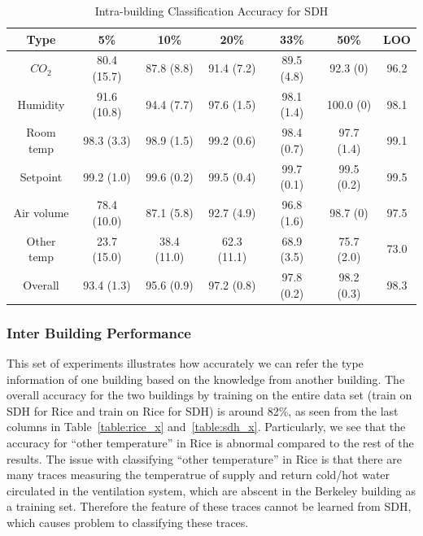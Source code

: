 \begin{table}[ht!]
\centering %
\begin{tabular}{c | c | c | c | c | c | c}%
\hline %
Type & 5\% & 10\% & 20\% & 33\% & 50\% & LOO\\ %
\hline\hline %
$CO_{2}$ & 80.4 (15.7) & 87.8 (8.8) & 91.4 (7.2) & 89.5 (4.8) & 92.3 (0) & 96.2\\ \hline
Humidity & 91.6 (10.8) & 94.4 (7.7) & 97.6 (1.5) & 98.1 (1.4) & 100.0 (0) & 98.1\\ \hline
Room temp & 98.3 (3.3) & 98.9 (1.5) & 99.2 (0.6) & 98.4 (0.7) & 97.7 (1.4) & 99.1\\ \hline
Setpoint & 99.2 (1.0) & 99.6 (0.2) & 99.5 (0.4) & 99.7 (0.1) & 99.5 (0.2) & 99.5\\ \hline
Air volume & 78.4 (10.0) & 87.1 (5.8) & 92.7 (4.9) & 96.8 (1.6) & 98.7 (0) & 97.5\\ \hline
Other temp & 23.7 (15.0) & 38.4 (11.0) & 62.3 (11.1) & 68.9 (3.5) & 75.7 (2.0) & 73.0\\ \hline
Overall & 93.4 (1.3) & 95.6 (0.9) & 97.2 (0.8) & 97.8 (0.2) & 98.2 (0.3) & 98.3\\ \hline
\end{tabular}
\caption{Intra-building Classification Accuracy for SDH}
\label{table:sdh} %
\end{table}

\subsubsection{Inter Building Performance}
This set of experiments illustrates how accurately we can refer the type information of one building based on the knowledge from another building. The overall accuracy for the two buildings by training on the entire data set (train on SDH for Rice and train on Rice for SDH) is around 82\%, as seen from the last columns in Table~\ref{table:rice_x} and~\ref{table:sdh_x}. Particularly, we see that the accuracy for ``other temperature'' in Rice is abnormal compared to the rest of the
results. The issue with classifying ``other temperature'' in Rice is that there are many traces measuring the temperatrue of supply and return cold/hot water circulated in the ventilation system, which are abscent in the Berkeley building as a training set. Therefore the feature of these traces cannot be learned from SDH, which causes problem to classifying these traces.

